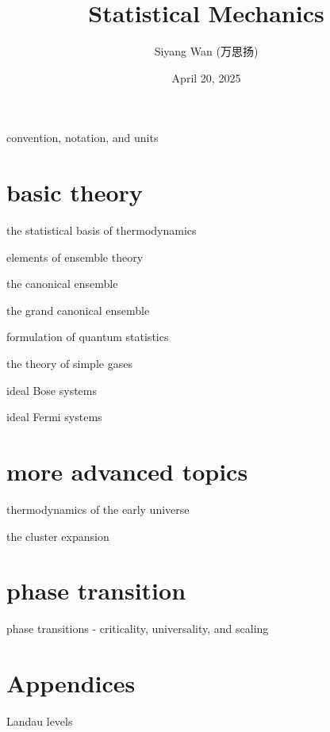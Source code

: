 \documentclass[10pt, a4paper]{report}
\title{\Huge \textbf{Statistical Mechanics}}
\author{Siyang Wan (万思扬)}
\date{April 20, 2025}
\renewcommand{\chaptermark}[1]{%
	\markboth{Chapter \thechapter\ #1}{}%
}
\numberwithin{equation}{section}
\begin{document}
	\maketitle
	
	\tableofcontents
	
	\pagebreak
	
	{convention, notation, and units}
	
	\part{basic theory}
	
	{the statistical basis of thermodynamics}
	
	{elements of ensemble theory}
	
	{the canonical ensemble}
	
	{the grand canonical ensemble}
	
	{formulation of quantum statistics}
	
	{the theory of simple gases}
	
	{ideal Bose systems}
	
	{ideal Fermi systems}
	
	\part{more advanced topics}
	
	{thermodynamics of the early universe}
	
	{the cluster expansion}
	
	\part{phase transition}
	
	{phase transitions - criticality, universality, and scaling}
	
	\appendix
	\part*{Appendices}
	\renewcommand{\chaptermark}[1]{%
		\markboth{Appendix \thechapter\ #1}{}%
	}
	
	{Landau levels}
\end{document}
